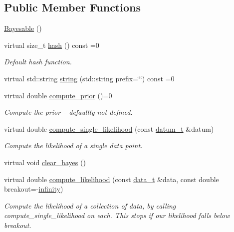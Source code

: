 \subsection*{Public Member Functions}
\begin{DoxyCompactItemize}
\item 
\hyperlink{class_bayesable_aec41e7016c9c1eb6978e1360c23f20cd}{Bayesable} ()
\item 
virtual size\+\_\+t \hyperlink{class_bayesable_a26f6d55e7526ebd897cbb27c757b611b}{hash} () const =0
\begin{DoxyCompactList}\small\item\em Default hash function. \end{DoxyCompactList}\item 
virtual std\+::string \hyperlink{class_bayesable_ab6944b4bfe5620c96048287a51d019c1}{string} (std\+::string prefix=\char`\"{}\char`\"{}) const =0
\item 
virtual double \hyperlink{class_bayesable_a1b057a17212ced123545133e2297c01b}{compute\+\_\+prior} ()=0
\begin{DoxyCompactList}\small\item\em Compute the prior -- defaultly not defined. \end{DoxyCompactList}\item 
virtual double \hyperlink{class_bayesable_a87d195bfe5cdf6d293dae5fc01ae2e6c}{compute\+\_\+single\+\_\+likelihood} (const \hyperlink{class_bayesable_a9f1a6c0cd7855550fa10b1a8f13a5867}{datum\+\_\+t} \&datum)
\begin{DoxyCompactList}\small\item\em Compute the likelihood of a single data point. \end{DoxyCompactList}\item 
virtual void \hyperlink{class_bayesable_ac8ab4bb38c8782d2dcd57f3a43a3c605}{clear\+\_\+bayes} ()
\item 
virtual double \hyperlink{class_bayesable_a202493156cec15937bee304d807fdbdb}{compute\+\_\+likelihood} (const \hyperlink{class_bayesable_aa2788c4d7718c0a824e1d28c4c98f921}{data\+\_\+t} \&data, const double breakout=-\/\hyperlink{_numerics_8h_af9434aea82baf2f6a5d9b6f9e36db08e}{infinity})
\begin{DoxyCompactList}\small\item\em Compute the likelihood of a collection of data, by calling compute\+\_\+single\+\_\+likelihood on each. This stops if our likelihood falls below breakout. \end{DoxyCompactList}\item 

\end{DoxyCompactItemize}
